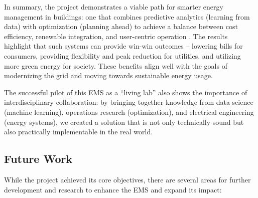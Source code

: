 \documentclass[12pt,a4paper]{article}
\begin{document}
In summary, the project demonstrates a viable path for smarter energy management in buildings: one that combines predictive analytics (learning from data) with optimization (planning ahead) to achieve a balance between cost efficiency, renewable integration, and user-centric operation \cite{Chen2024, Rehman2025}. The results highlight that such systems can provide win-win outcomes – lowering bills for consumers, providing flexibility and peak reduction for utilities, and utilizing more green energy for society. These benefits align well with the goals of modernizing the grid and moving towards sustainable energy usage.

The successful pilot of this EMS as a “living lab” also shows the importance of interdisciplinary collaboration: by bringing together knowledge from data science (machine learning), operations research (optimization), and electrical engineering (energy systems), we created a solution that is not only technically sound but also practically implementable in the real world. 

\subsection*{Future Work}
While the project achieved its core objectives, there are several areas for further development and research to enhance the EMS and expand its impact:
\end{document}
